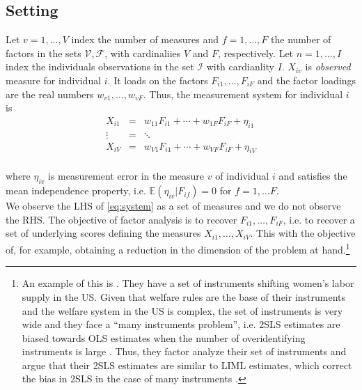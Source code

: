 \subsection{Setting}
Let $v = 1, \ldots, V$ index the number of measures and $f = 1, \ldots, F$ the number of factors in the sets $\mathcal{V}, \mathcal{F}$, with cardinaliies $V$ and $F$, respectively. Let $n = 1, \ldots, I$ index the individuals observations in the set $\mathcal{I}$ with cardianlity $I$. $X_{iv}$ is \textit{observed} measure for individual $i$. It loads on the factors $F_{i1}, \ldots, F_{iF}$ and the factor loadings are the real numbers $w_{v1}, \ldots, w_{vF}$. Thus, the measurement system for individual $i$ is 
\begin{eqnarray}
X_{i1} &=& w_{11}F_{i1} + \cdots + w_{1F}F_{iF} + \eta_{i1} \nonumber \\
\vdots &=& \ddots \nonumber \\
X_{iV} &=& w_{V1}F_{i1} + \cdots + w_{VF}F_{iF} + \eta_{iV} \label{eq:system} \\
\end{eqnarray}

\noindent where $\eta_{iv}$ is measurement error in the measure $v$ of individual $i$ and satisfies the mean independence property, i.e. $\mathbb{E} \left( \eta_{iv} | F_{if}  \right) = 0$ for $f = 1, \ldots F$.\\
\indent We observe the LHS of \eqref{eq:system} as a set of measures and we do not observe the RHS. The objective of factor analysis is to recover $F_{i1}, \ldots, F_{iF}$, i.e. to recover a set of underlying scores defining the measures  $X_{i1}, \ldots, X_{iV}$. This with the objective of, for example, obtaining a reduction in the dimension of the problem at hand.\footnote{An example of this is \citet{bernal2011child}. They have a set of instruments shifting women's labor supply in the US. Given that welfare rules are the base of their instruments and the welfare system in the US is complex, the set of instruments is very wide and they face a ``many instruments problem'', i.e. 2SLS estimates are biased towards OLS estimates when the number of overidentifying instruments is large \citep[see][]{stock2002testing,andrews2007testing,hansen2008estimation,anderson2010asymptotic}. Thus, they factor analyze their set of instruments and argue that their 2SLS estimates are similar to LIML estimates, which correct the bias in 2SLS in the case of many instruments \citep[see][]{hansen2008estimation}.}
